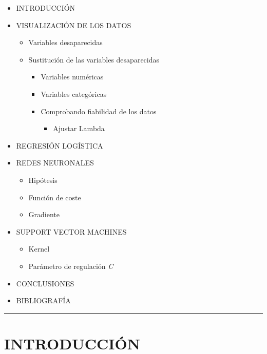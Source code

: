 \documentclass[11pt]{article}
\providecommand{\tightlist}{%
      \setlength{\itemsep}{0pt}\setlength{\parskip}{0pt}}
\begin{document}
\begin{itemize}
\item
  INTRODUCCIÓN
\item
  VISUALIZACIÓN DE LOS DATOS

  \begin{itemize}
  \item
    Variables desaparecidas
  \item
    Sustitución de las variables desaparecidas

    \begin{itemize}
    \tightlist
    \item
      Variables numéricas
    \item
      Variables categóricas
    \item
      Comprobando fiabilidad de los datos

      \begin{itemize}
      \tightlist
      \item
        Ajustar Lambda
      \end{itemize}
    \end{itemize}
  \end{itemize}
\item
  REGRESIÓN LOGÍSTICA
\item
  REDES NEURONALES

  \begin{itemize}
  \tightlist
  \item
    Hipótesis
  \item
    Función de coste
  \item
    Gradiente
  \end{itemize}
\item
  SUPPORT VECTOR MACHINES

  \begin{itemize}
  \tightlist
  \item
    Kernel
  \item
    Parámetro de regulación \emph{C}
  \end{itemize}
\item
  CONCLUSIONES
\item
  BIBLIOGRAFÍA
\end{itemize}

    \begin{center}\rule{0.5\linewidth}{\linethickness}\end{center}

    \section{INTRODUCCIÓN}\label{introducciuxf3n}
\end{document}
